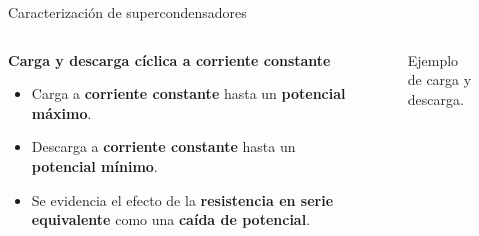 \documentclass[aspectratio=169]{beamer}
\begin{document}
	\begin{frame}[fragile]{Caracterización de supercondensadores}
		\begin{columns}
			\begin{column}{0.5\textwidth}
				\only<1-> \textbf{Carga y descarga cíclica a corriente constante}
				\begin{itemize}[<+(1)->]
					\item Carga a \textbf{corriente constante} hasta un \textbf{potencial máximo}.
					\item Descarga a \textbf{corriente constante} hasta un \textbf{potencial mínimo}.
					\item Se evidencia el efecto de la\textbf{ resistencia en serie equivalente} como una \textbf{caída de potencial}.
				\end{itemize}
			\end{column}
			\begin{column}{0.5\textwidth}
				\begin{figure}
					\caption{Ejemplo de carga y descarga.}
				\end{figure}			
			\end{column}
		\end{columns}
	\end{frame}
\end{document}
